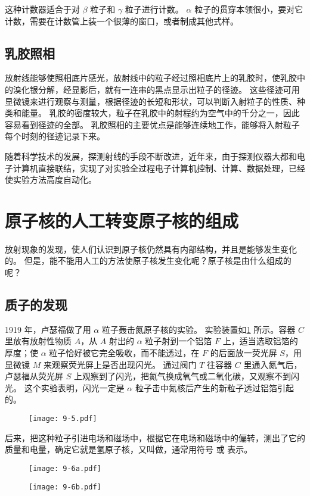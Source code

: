 这种计数器适合于对 $\beta$ 粒子和 $\gamma$ 粒子进行计数。
$\alpha$ 粒子的贯穿本领很小，要对它计数，需要在计数管上装一个很薄的窗口，或者制成其他式样。

\subsection{乳胶照相}
放射线能够使照相底片感光，放射线中的粒子经过照相底片上的乳胶时，使乳胶中的溴化银分解，经显影后，就有一连串的黑点显示出粒子的径迹。
这些径迹可用显微镜来进行观察与测量，根据径迹的长短和形状，可以判断入射粒子的性质、种类和能量。
乳胶的密度较大，粒子在乳胶中的射程约为空气中的千分之一，因此容易看到径迹的全部。
乳胶照相的主要优点是能够连续地工作，能够将入射粒子每个时刻的径迹记录下来。

随着科学技术的发展，探测射线的手段不断改进，近年来，由于探测仪器大都和电子计算机直接联结，实现了对实验全过程电子计算机控制、计算、数据处理，已经使实验方法高度自动化。

\section{原子核的人工转变\texorpdfstring{\quad}{ }原子核的组成}
放射现象的发现，使人们认识到原子核仍然具有内部结构，并且是能够发生变化的。
但是，能不能用人工的方法使原子核发生变化呢？原子核是由什么组成的呢？

\subsection{质子的发现}

1919 年，卢瑟福做了用 $\alpha$ 粒子轰击氮原子核的实验。
实验装置如\cref{fig:9-5} 所示。容器 $C$ 里放有放射性物质 $A$，从 $A$ 射出的 $\alpha$ 粒子射到一个铝箔 $F$ 上，适当选取铝箔的厚度；使 $\alpha$ 粒子恰好被它完全吸收，而不能透过，在 $F$ 的后面放一荧光屏 $S$，用显微镜 $M$ 来观察荧光屏上是否出现闪光。
通过阀门 $T$ 往容器 $C$ 里通入氮气后，卢瑟福从荧光屏 $S$ 上观察到了闪光，把氮气换成氧气或二氧化碳，又观察不到闪光。
这个实验表明，闪光一定是 $\alpha$ 粒子击中氮核后产生的新粒子透过铝箔引起的。
\begin{figure}
  \texttt{[image: 9-5.pdf]}
  \caption{}\label{fig:9-5}
\end{figure}

后来，把这种粒子引进电场和磁场中，根据它在电场和磁场中的偏转，测出了它的质量和电量，确定它就是氢原子核，又叫做，通常用符号  或  表示。
\begin{figure}
  \begin{minipage}[b]{0.4\linewidth}\centering
    \texttt{[image: 9-6a.pdf]}
    \subcaption{}\label{fig:9-6a}
  \end{minipage}
  \begin{minipage}[b]{0.4\linewidth}\centering
    \texttt{[image: 9-6b.pdf]}
    \subcaption{}\label{fig:9-6b}
  \end{minipage}
  \caption{}\label{fig:9-6}
\end{figure}

